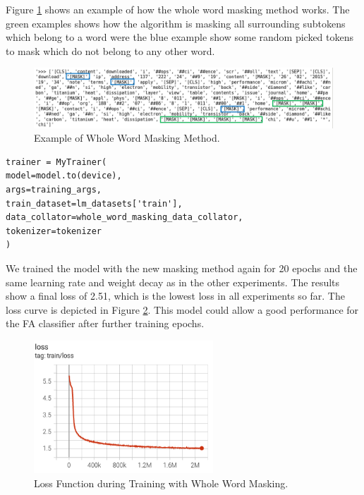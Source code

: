 \alert{Figure \ref{fig:wwm_ex} shows an example of how the whole word masking method works. The green examples shows how the algorithm is masking all surrounding subtokens which belong to a word were the blue example show some random picked tokens to mask which do not belong to any other word.}

\begin{figure}[H]
 	\centering
 	\includegraphics[width=1\textwidth]{figures/wwm_example.png}
 	\caption{Example of Whole Word Masking Method.}
 	\label{fig:wwm_ex}
 \end{figure}

\begin{code}
\label{code:trainer_wwm}
\begin{verbatim}
trainer = MyTrainer(
model=model.to(device),
args=training_args,
train_dataset=lm_datasets['train'],
data_collator=whole_word_masking_data_collator,
tokenizer=tokenizer
)
\end{verbatim}
\end{code}

We trained the model with the new masking method again for 20 epochs and the same learning rate and weight decay as in the other experiments. The results show a final loss of 2.51, which is the lowest loss in all experiments so far. The loss curve is depicted in Figure \ref{fig:loss_wwm}. This model could allow a good performance for the FA classifier after further training epochs. 

\begin{figure}[H]
	\centering
	\includegraphics[width=0.6\textwidth]{figures/loss_wwm_20.png}
	\caption{Loss Function during Training with Whole Word Masking.}
	\label{fig:loss_wwm}
\end{figure}